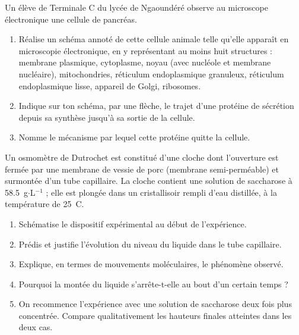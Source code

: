 \documentclass[11pt]{article}
\newcounter{popsec}
\newcounter{popsub}
\newcommand{\courssub}[1]{%
  \stepcounter{popsub}%
  \par\vspace{9pt}\noindent{\popxbold\fontsize{11.5}{13}\selectfont\color{popink}{\color{poporange}\thepopsec.\thepopsub}\hspace{6pt}#1}\par\nopagebreak\vspace{4pt}
}
\begin{document}
\courssub{Je m'entraîne}

\begin{exercice}
Un élève de Terminale C du lycée de Ngaoundéré observe au microscope électronique une cellule de pancréas.
\begin{enumerate}
\item Réalise un schéma annoté de cette cellule animale telle qu'elle apparaît en microscopie électronique, en y représentant au moins huit structures : membrane plasmique, cytoplasme, noyau (avec nucléole et membrane nucléaire), mitochondries, réticulum endoplasmique granuleux, réticulum endoplasmique lisse, appareil de Golgi, ribosomes.
\item Indique sur ton schéma, par une flèche, le trajet d'une protéine de sécrétion depuis sa synthèse jusqu'à sa sortie de la cellule.
\item Nomme le mécanisme par lequel cette protéine quitte la cellule.
\end{enumerate}
\end{exercice}

\begin{exercice}
Un osmomètre de Dutrochet est constitué d'une cloche dont l'ouverture est fermée par une membrane de vessie de porc (membrane semi-perméable) et surmontée d'un tube capillaire. La cloche contient une solution de saccharose à \num{58,5}~g$\cdot$L$^{-1}$ ; elle est plongée dans un cristallisoir rempli d'eau distillée, à la température de 25~\textdegree C.
\begin{enumerate}
\item Schématise le dispositif expérimental au début de l'expérience.
\item Prédis et justifie l'évolution du niveau du liquide dans le tube capillaire.
\item Explique, en termes de mouvements moléculaires, le phénomène observé.
\item Pourquoi la montée du liquide s'arrête-t-elle au bout d'un certain temps ?
\item On recommence l'expérience avec une solution de saccharose deux fois plus concentrée. Compare qualitativement les hauteurs finales atteintes dans les deux cas.
\end{enumerate}
\end{exercice}
\end{document}

